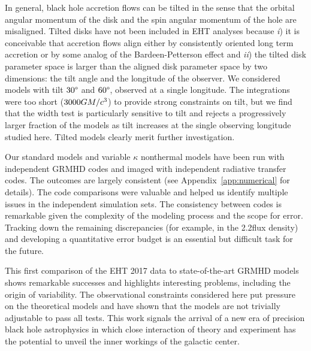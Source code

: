 In general, black hole accretion flows can be tilted in the sense that the orbital angular momentum of the disk and the spin angular momentum of the hole are misaligned.  Tilted disks have not been included in EHT analyses because \emph{i}) it is conceivable that accretion flows align either by consistently oriented long term accretion or by some analog of the Bardeen-Petterson effect \citep{1975ApJ...195L..65B} and \emph{ii}) the tilted disk parameter space is larger than the aligned disk parameter space by two dimensions: the tilt angle and the longitude of the observer.  We considered models with tilt $30\degree$ and $60\degree$, observed at a single longitude.  The integrations were too short ($3000GM/c^3$) to provide strong constraints on tilt, but we find that the \mring width test is particularly sensitive to tilt and rejects a progressively larger fraction of the models as tilt increases at the single observing longitude studied here.  Tilted models clearly merit further investigation.

Our standard models and variable $\kappa$ nonthermal models have been run with independent GRMHD codes and imaged with independent radiative transfer codes.  The outcomes are largely consistent (see Appendix~\ref{app:numerical} for details).  The code comparisons were valuable and helped us identify multiple issues in the independent simulation sets.  The consistency between codes is remarkable given the complexity of the modeling process and the scope for error.  Tracking down the remaining discrepancies (for example, in the 2.2\um flux density) and developing a quantitative error budget is an essential but difficult task for the future.

This first comparison of the EHT 2017 \sgra data to state-of-the-art GRMHD models shows remarkable successes and highlights interesting problems, including the origin of variability.  The observational constraints considered here put pressure on the theoretical models and have shown that the models are not trivially adjustable to pass all tests.  This work signals the arrival of a new era of precision black hole astrophysics in which close interaction of theory and experiment has the potential to unveil the inner workings of the galactic center.
